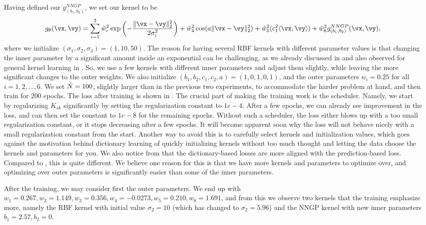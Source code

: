 \documentclass{article}
\begin{document}
Having defined our \(g^{NNGP}_{(b_1,b_2)}\), we set our kernel to be
\begin{align*}
    g_{\theta}(\vx,\vy) =  \sum_{i=1}^{3} \Tilde w_{i}^2 \exp\left(-\frac{\lVert \vx-\vy \rVert^2_2}{2\sigma_i^2}\right) + \Tilde w_4^2 \cos(a \lVert \vx-\vy \rVert^2_2) + \Tilde w_5^2 (c_1^2 \langle \vx, \vy\rangle) + \Tilde w_6^2 g^{NNGP}_{(b_1, b_2)}(\vx, \vy), 
\end{align*}
where we initialize \((\sigma_{1}, \sigma_2, \sigma_3) = (1,10, 50)\). The reason for having several RBF kernels with different parameter values is that changing the inner parameter by a significant amount inside an exponential can be challenging, as we already discussed in  and also observed for general kernel learning in \citet{lengyel-2025}. So, we use a few kernels with different inner parameters and adjust them slightly, while leaving the more significant changes to the outer weights. We also initialize \((b_1, b_2, c_1, c_2, a) = (1, 0, 1, 0, 1)\), and the outer parameters \(w_i = 0.25\) for all \(i=1,2,\dots,6\). We set \(\Tilde N = 100\), slightly larger than in the previous two experiments, to accommodate the harder problem at hand, and then train for 200 epochs. The loss after training is shown in . The crucial part of making the training work is the scheduler. Namely, we start by regularizing \(K_{sk}\) significantly by setting the regularization constant to \(1e-4\). After a few epochs, we can already see improvement in the loss, and can then set the constant to \(1e-8\) for the remaining epochs. Without such a scheduler, the loss either blows up with a too small regularization constant, or it stops decreasing after a few epochs. It will become apparent soon why the loss will not behave nicely with a small regularization constant from the start. Another way to avoid this is to carefully select kernels and initialization values, which goes against the motivation behind dictionary learning of quickly initializing kernels without too much thought and letting the data choose the kernels and parameters for you. We also notice from  that the dictionary-based losses are more aligned with the prediction-based loss. Compared to , this is quite different. We believe one reason for this is that we have more kernels and parameters to optimize over, and optimizing over outer parameters is significantly easier than some of the inner parameters.

After the training, we may consider first the outer parameters. We end up with \(w_1=0.267, w_2=1.149, w_3=0.356, w_4=-0.0273, w_5=0.210, w_6=1.691\), and from this we observe two kernels that the training emphasize more, namely the RBF kernel with initial value \(\sigma_2 = 10\) (which has changed to \(\sigma_2=5.96\)) and the NNGP kernel with new inner parameters \(b_1=2.57, b_2=0\).
\end{document}
